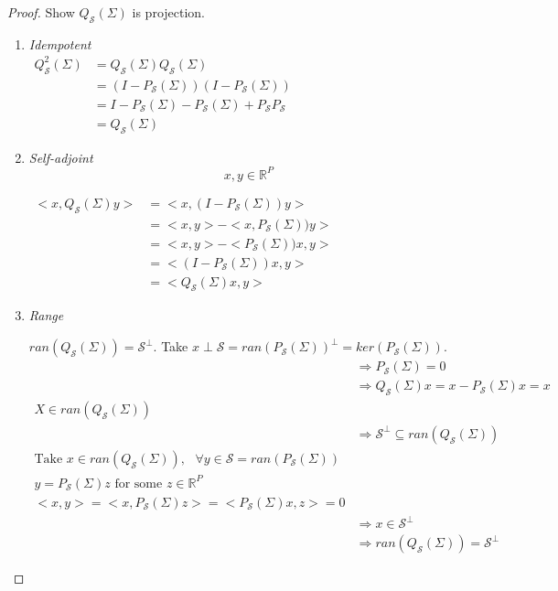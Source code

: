\documentclass[11pt,fleqn]{book} %
\begin{document}
\begin{proof}
	 Show $Q_\mathscr{S} (\Sigma)$ is projection. \\
		
	 	\begin{enumerate}
	 		\item \textit{Idempotent}\\
				$\begin{aligned}	
							Q_\mathscr{S}^2 (\Sigma) &= Q_\mathscr{S} (\Sigma) Q_\mathscr{S} (\Sigma) \\
							&= (I - P_\mathscr{S} (\Sigma))(I - P_\mathscr{S} (\Sigma))\\
							&= I - P_\mathscr{S} (\Sigma) - P_\mathscr{S}(\Sigma) + P_\mathscr{S}P_\mathscr{S}\\
							&= Q_\mathscr{S} (\Sigma)
				\end{aligned}$

			\item \textit{Self-adjoint}\\
					$$x, y \in \mathbb{R}^P$$

					$\begin{aligned}
						<x, Q_\mathscr{S}(\Sigma) y> &= <x, (I - P_\mathscr{S} (\Sigma)) y>\\
						&= <x,y> - <x, P_\mathscr{S} (\Sigma)) y>\\
						&= <x,y> - <P_\mathscr{S} (\Sigma)) x,  y>\\
						&= <(I - P_\mathscr{S} (\Sigma))x, y>\\
						&= <Q_\mathscr{S}(\Sigma) x, y>				
					\end{aligned}$

			\item \textit{Range}

				$ran(Q_\mathscr{S} (\Sigma)) = \mathscr{S}^\perp$. Take $x \perp \mathscr{S} = ran(P_\mathscr{S}(\Sigma))^\perp = ker(P_\mathscr{S}(\Sigma)).$\\

				$\begin{aligned}
						&\Rightarrow P_\mathscr{S}(\Sigma) = 0\\
						&\Rightarrow Q_\mathscr{S}(\Sigma) x = x - P_\mathscr{S}(\Sigma) x  = x\\
						X \in ran(Q_\mathscr{S}(\Sigma))\\
						&\Rightarrow \mathscr{S}^\perp \subseteq ran(Q_\mathscr{S}(\Sigma))\\
						\text{Take } x\in ran(Q_\mathscr{S}(\Sigma)), \text{ } \forall y \in \mathscr{S} = ran(P_\mathscr{S}(\Sigma))\\
						y = P_\mathscr{S}(\Sigma)z \text{ for some } z \in \mathbb{R}^P\\
						<x, y> = <x, P_\mathscr{S}(\Sigma) z> = <P_\mathscr{S}(\Sigma)x,  z> = 0\\
						&\Rightarrow x \in \mathscr{S}^\perp\\
						&\Rightarrow ran(Q_\mathscr{S}(\Sigma)) = \mathscr{S}^\perp
				\end{aligned}$	
	 	\end{enumerate}	


\end{proof}
\end{document}
